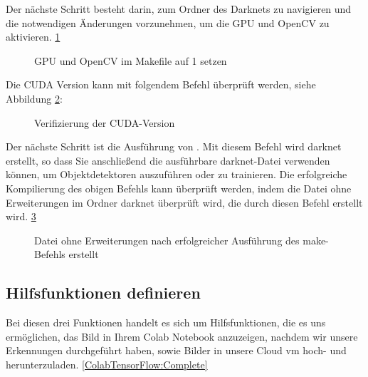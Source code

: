 \medskip


\medskip

Der nächste Schritt besteht darin, zum Ordner des Darknets zu navigieren und die notwendigen Änderungen vorzunehmen, um die GPU und OpenCV zu aktivieren. \ref{ColabGPU}

\begin{figure}[H]
	\centering
	\caption{GPU und OpenCV im Makefile auf 1 setzen}\label{ColabGPU}
\end{figure}

Die CUDA Version kann mit folgendem Befehl überprüft werden, siehe Abbildung \ref{ColabCUDA}:

\medskip


\medskip

\begin{figure}[H]
	\centering
	\caption{Verifizierung der CUDA-Version}\label{ColabCUDA}
\end{figure}

Der nächste Schritt ist die Ausführung von .
Mit diesem Befehl wird darknet erstellt, so dass Sie anschließend die ausführbare darknet-Datei verwenden können, um Objektdetektoren auszuführen oder zu trainieren.
Die erfolgreiche Kompilierung des obigen Befehls kann überprüft werden, indem die Datei  ohne Erweiterungen im Ordner \glqq darknet\grqq{} überprüft wird, die durch diesen Befehl erstellt wird. \ref{ColabDarknet}

\begin{figure}[H]
	\centering
	\caption{Datei  ohne Erweiterungen nach erfolgreicher Ausführung des make-Befehls erstellt}\label{ColabDarknet}
\end{figure}

\subsection{Hilfsfunktionen definieren}

Bei diesen drei Funktionen handelt es sich um Hilfsfunktionen, die es uns ermöglichen, das Bild in Ihrem Colab Notebook anzuzeigen, nachdem wir unsere Erkennungen durchgeführt haben, sowie Bilder in unsere Cloud \ac{vm} hoch- und herunterzuladen. \ref{ColabTensorFlow:Complete}

